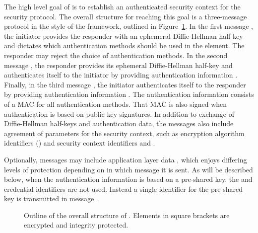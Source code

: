 The high level goal of \mEdhoc{} is to establish an authenticated security
context for the \mOscore{} security protocol.
%
The overall structure for reaching this goal is a three-message protocol in
the style of the \mNoise{} framework, outlined in
Figure~\ref{fig:edhocFramework}.
%
In the first message \mMsgone{}, the initiator provides the responder with an
ephemeral Diffie-Hellman half-key \mGx{} and dictates which authentication
methods should be used in the \mMethod{} element.
%
The responder may reject the choice of authentication methods.
%
In the second message \mMsgtwo{}, the responder provides its ephemeral
Diffie-Hellman half-key \mGy{} and authenticates itself to the initiator by
providing authentication information \mAuthr{}.
%
Finally, in the third message \mMsgthree{}, the initiator authenticates itself
to the responder by providing authentication information \mAuthi{}.
%
The authentication information consists of a MAC for all authentication methods.
%
That MAC is also signed when authentication is based on public key signatures.
%
In addition to exchange of Diffie-Hellman half-keys and authentication data,
the messages also include agreement of parameters for the \mOscore{} security
context, such as encryption algorithm identifiers (\mSuites{}) and \mOscore{}
security context identifiers \mCi{} and \mCr{}.
%

Optionally, messages may include application layer data \mAD{}, which enjoys
differing levels of protection depending on in which message it is sent.
%
As will be described below, when the authentication information is based on a
pre-shared key, the \mCredi{} and \mCredr{} credential identifiers are not
used.
%
Instead a single identifier for the pre-shared key is transmitted in message
\mMsgone{}.
%

\begin{figure}[!h]
\centering
{}
\caption{Outline of the overall structure of \mEdhoc{}. Elements in square
brackets are encrypted and integrity protected.}
\label{fig:edhocFramework}
\end{figure}


